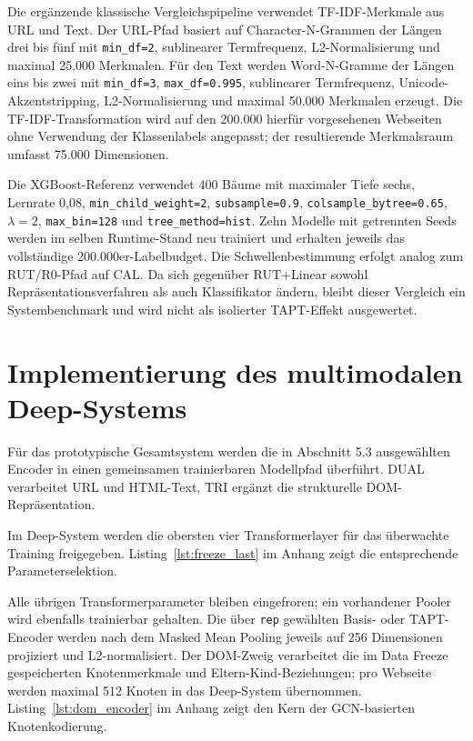 Die ergänzende klassische Vergleichspipeline verwendet TF-IDF-Merkmale aus URL und Text.
Der URL-Pfad basiert auf Character-N-Grammen der Längen drei bis fünf mit
\nolinkurl{min_df=2}, sublinearer Termfrequenz, L2-Normalisierung und maximal 25.000
Merkmalen. Für den Text werden Word-N-Gramme der Längen eins bis zwei mit
\nolinkurl{min_df=3}, \nolinkurl{max_df=0.995}, sublinearer Termfrequenz,
Unicode-Akzentstripping, L2-Normalisierung und maximal 50.000 Merkmalen erzeugt. Die
TF-IDF-Transformation wird auf den 200.000 hierfür vorgesehenen Webseiten ohne Verwendung
der Klassenlabels angepasst; der resultierende Merkmalsraum umfasst 75.000 Dimensionen.

Die XGBoost-Referenz verwendet 400 Bäume mit maximaler Tiefe sechs, Lernrate 0,08,
\nolinkurl{min_child_weight=2}, \texttt{subsample=0.9},
\nolinkurl{colsample_bytree=0.65}, $\lambda=2$, \nolinkurl{max_bin=128} und
\nolinkurl{tree_method=hist}. Zehn Modelle mit getrennten Seeds werden im selben Runtime-Stand
neu trainiert und erhalten jeweils das vollständige 200.000er-Labelbudget. Die
Schwellenbestimmung erfolgt analog zum RUT/R0-Pfad auf CAL. Da sich gegenüber RUT+Linear
sowohl Repräsentationsverfahren als auch Klassifikator ändern, bleibt dieser Vergleich ein
Systembenchmark und wird nicht als isolierter TAPT-Effekt ausgewertet.

\section{Implementierung des multimodalen Deep-Systems}

Für das prototypische Gesamtsystem werden die in Abschnitt 5.3 ausgewählten Encoder in
einen gemeinsamen trainierbaren Modellpfad überführt. DUAL verarbeitet URL und HTML-Text,
TRI ergänzt die strukturelle DOM-Repräsentation.

Im Deep-System werden die obersten vier Transformerlayer für das überwachte Training
freigegeben. Listing~\ref{lst:freeze_last} im Anhang zeigt die entsprechende Parameterselektion.

Alle übrigen Transformerparameter bleiben eingefroren; ein vorhandener Pooler wird ebenfalls
trainierbar gehalten. Die über \texttt{rep} gewählten Basis- oder TAPT-Encoder werden nach
dem Masked Mean Pooling jeweils auf 256 Dimensionen projiziert und L2-normalisiert. Der
DOM-Zweig verarbeitet die im Data Freeze gespeicherten Knotenmerkmale und
Eltern-Kind-Beziehungen; pro Webseite werden maximal 512 Knoten in das Deep-System
übernommen. Listing~\ref{lst:dom_encoder} im Anhang zeigt den Kern der GCN-basierten Knotenkodierung.

